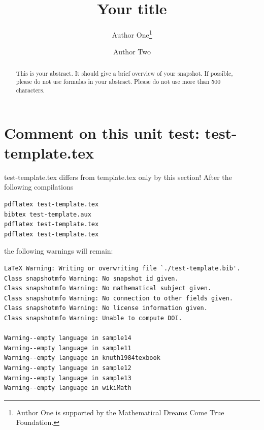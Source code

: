 \documentclass{snapshotmfo}
\author{Author One\thanks{Author One is supported by the Mathematical Dreams Come True Foundation.} \and Author Two}
\title{Your title}
\begin{document}

\begin{abstract}
This is your abstract. It should give a brief overview of your snapshot. If possible, please do not use formulas in your abstract. Please do not use more than 500 characters. 
\end{abstract}

\section{Comment on this unit test: test-template.tex}
test-template.tex differs from template.tex only by this section!
After the following compilations
\begin{verbatim}
pdflatex test-template.tex
bibtex test-template.aux
pdflatex test-template.tex
pdflatex test-template.tex
\end{verbatim}
the following warnings will remain:
\begin{verbatim}
LaTeX Warning: Writing or overwriting file `./test-template.bib'.
Class snapshotmfo Warning: No snapshot id given.
Class snapshotmfo Warning: No mathematical subject given.
Class snapshotmfo Warning: No connection to other fields given.
Class snapshotmfo Warning: No license information given.
Class snapshotmfo Warning: Unable to compute DOI.

Warning--empty language in sample14
Warning--empty language in sample11
Warning--empty language in knuth1984texbook
Warning--empty language in sample12
Warning--empty language in sample13
Warning--empty language in wikiMath
\end{verbatim}
\end{document}
